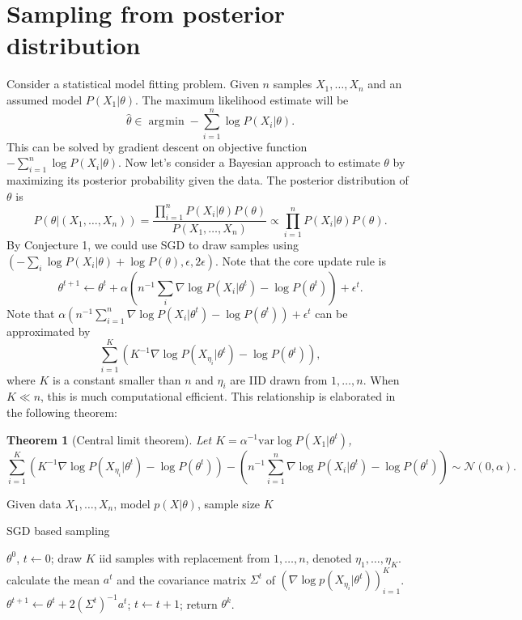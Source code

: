 \documentclass[preprint,12pt,3p]{elsarticle}
\newcommand{\N}{\mathscr{N}}
\newcommand{\var}{\mathrm{var}}
\DeclareMathOperator*{\argmin}{\arg\!\min}
\newtheorem{theorem}{Theorem}
\begin{document}
\section{Sampling from posterior distribution}
Consider a statistical model fitting problem. Given $n$ samples $X_1,\ldots, X_n$ and an assumed model $P(X_1|\theta)$. The maximum likelihood estimate will be
\[
\hat{\theta} \in \argmin - \sum_{i=1}^n \log P(X_i|\theta).
\]
This can be solved by gradient descent on objective function $- \sum_{i=1}^n \log P(X_i|\theta)$. Now let's consider a Bayesian approach to estimate $\theta$ by maximizing its posterior probability given the data. The posterior distribution of $\theta$ is
\[
P(\theta|(X_1,\ldots, X_n)) = \frac{\prod_{i=1}^n P(X_i|\theta) P(\theta)}{P(X_1,\ldots, X_n)} \propto \prod_{i=1}^n P(X_i|\theta) P(\theta).
\]
By Conjecture 1, we could use SGD to draw samples using $(-\sum_i \log P(X_i|\theta) + \log P(\theta), \epsilon, 2\epsilon)$.  Note that the core update rule is
\[
\theta^{t+1} \gets \theta^{t} + \alpha (n^{-1} \sum_i \nabla \log P(X_i|\theta^t) - \log P(\theta^t)) + \epsilon^t.
\]
Note that $\alpha (n^{-1} \sum_{i=1}^n \nabla \log P(X_i|\theta^t) - \log P(\theta^t)) + \epsilon^t$ can be approximated by
\[
\sum_{i=1}^K (K^{-1} \nabla \log P(X_{\eta_i}|\theta^t) - \log P(\theta^t)),
\]
where $K$ is a constant smaller than $n$ and $\eta_i$ are IID drawn from $1,\ldots, n$. When $K\ll n$, this is much computational efficient. This relationship is elaborated in the following theorem:
\begin{theorem}[Central limit theorem]
Let $K = \alpha^{-1} \var \log P(X_1|\theta^t)$,
\[
\sum_{i=1}^K (K^{-1}\nabla \log P(X_{\eta_i}|\theta^t) - \log P(\theta^t)) - (n^{-1} \sum_{i=1}^n \nabla \log P(X_i|\theta^t) - \log P(\theta^t)) \sim \N(0, \alpha).
\]
\end{theorem}
\begin{algorithm}
{\small
Given data $X_1,\ldots, X_n$, model $p(X|\theta)$, sample size $K$
\begin{algorithmic}\caption{SGD based sampling}\label{Alg:SGD_Sampling}
 $ \theta^0$, $t \gets 0$;
\STATE draw $K$ iid samples with replacement from $1,\ldots, n$, denoted $\eta_1,\ldots, \eta_K$.
\STATE calculate the mean $a^t$ and the covariance matrix $\Sigma^t$ of $(\nabla\log p(X_{\eta_i}|\theta^t))_{i=1}^K$.
\STATE
$\theta^{t+1} \gets \theta^t + 2(\Sigma^t)^{-1}a^t$;
\STATE $t\gets t+1$;
\ENDWHILE
\STATE return $\theta^k$.
\end{algorithmic}}
\end{algorithm}
\end{document}
